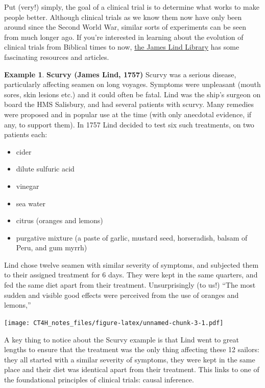 \documentclass[
  openany]{book}
\providecommand{\tightlist}{%
  \setlength{\itemsep}{0pt}\setlength{\parskip}{0pt}}
\theoremstyle{definition}
\theoremstyle{definition}
\newtheorem{example}{Example}[chapter]
\theoremstyle{definition}
\theoremstyle{definition}
\theoremstyle{remark}
\begin{document}
Put (very!) simply, the goal of a clinical trial is to determine what works to make people better. Although clinical trials as we know them now have only been around since the Second World War, similar sorts of experiments can be seen from much longer ago. If you're interested in learning about the evolution of clinical trials from Biblical times to now, \href{https://www.jameslindlibrary.org/}{the James Lind Library} has some fascinating resources and articles.

\begin{example}
\textbf{Scurvy (James Lind, 1757)}
Scurvy was a serious disease, particularly affecting seamen on long voyages. Symptoms were unpleasant (mouth sores, skin lesions etc.) and it could often be fatal. Lind was the ship's surgeon on board the HMS Salisbury, and had several patients with scurvy. Many remedies were proposed and in popular use at the time (with only anecdotal evidence, if any, to support them). In 1757 Lind decided to test six such treatments, on two patients each:

\begin{itemize}
\tightlist
\item
  cider
\item
  dilute sulfuric acid
\item
  vinegar
\item
  sea water
\item
  citrus (oranges and lemons)
\item
  purgative mixture (a paste of garlic, mustard seed, horseradish, balsam of Peru, and gum myrrh)
\end{itemize}

Lind chose twelve seamen with similar severity of symptoms, and subjected them to their assigned treatment for 6 days. They were kept in the same quarters, and fed the same diet apart from their treatment. Unsurprisingly (to us!) ``The most sudden and visible good effects were perceived from the use of oranges and lemons,''

\texttt{[image: CT4H\_notes\_files/figure-latex/unnamed-chunk-3-1.pdf]}
\end{example}

A key thing to notice about the Scurvy example is that Lind went to great lengths to ensure that the treatment was the only thing affecting these 12 sailors: they all started with a similar severity of symptoms, they were kept in the same place and their diet was identical apart from their treatment. This links to one of the foundational principles of clinical trials: causal inference.
\end{document}
